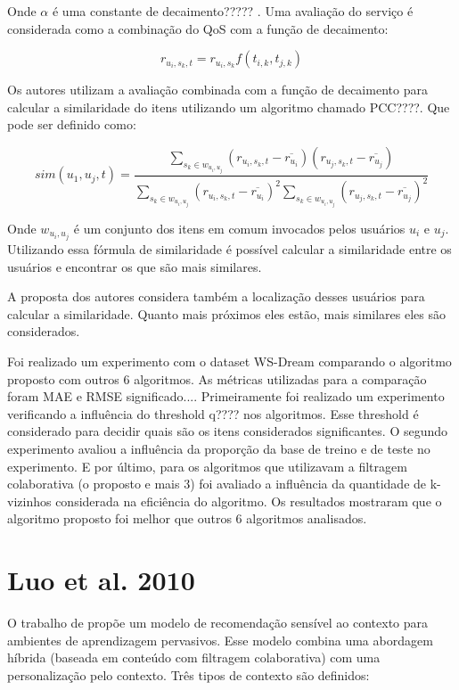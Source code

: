 Onde $\alpha$ é uma constante de decaimento????? . Uma avaliação do serviço é considerada como a combinação do QoS com
a função de decaimento:

\begin{equation}
  r_{u_i, s_k, t} = r_{u_i, s_k} f(t_{i,k}, t_{j,k})
  \label{eq:fan-avaliacao}
\end{equation}

Os autores utilizam a avaliação combinada com a função de decaimento para calcular a similaridade do itens utilizando
um algoritmo chamado PCC????. Que pode ser definido como:

\begin{equation}
  sim(u_1, u_j, t) = \frac{\sum_{s_k \in w_{u_i, u_j}}{(r_{u_i, s_k, t} - \overline{r_{u_i}})(r_{u_j, s_k, t} - \overline{r_{u_j}})}}{\sum_{s_k \in w_{u_i, u_j}}{(r_{u_i, s_k, t} - \overline{r_{u_i}})}^2 \sum_{s_k \in w_{u_i, u_j}}{(r_{u_j, s_k, t} - \overline{r_{u_j}})}^2}
  \label{eq:fan-avaliacao}
\end{equation}


Onde $w_{u_i, u_j}$ é um conjunto dos itens em comum invocados pelos usuários $u_i$ e $u_j$. Utilizando essa fórmula de
similaridade é possível calcular a similaridade entre os usuários e encontrar os que são mais similares.

A proposta dos autores considera também a localização desses usuários para calcular a similaridade. Quanto mais próximos
eles estão, mais similares eles são considerados.

Foi realizado um experimento com o dataset WS-Dream comparando o algoritmo proposto com outros 6 algoritmos. As
métricas utilizadas para a comparação foram MAE e RMSE significado.... Primeiramente foi realizado um experimento
verificando a influência do threshold q???? nos algoritmos. Esse threshold é considerado para decidir quais são os
itens considerados significantes. O segundo experimento avaliou a influência da proporção da base de treino e de teste
no experimento. E por último, para os algoritmos que utilizavam a filtragem colaborativa (o proposto e mais 3) foi
avaliado a influência da quantidade de k-vizinhos considerada na eficiência do algoritmo. Os resultados mostraram que
o algoritmo proposto foi melhor que outros 6 algoritmos analisados.

\section{Luo et al. 2010}

O trabalho de  propõe um modelo de recomendação sensível ao contexto para ambientes de
aprendizagem pervasivos. Esse modelo combina uma abordagem híbrida (baseada em conteúdo com filtragem colaborativa)
com uma personalização pelo contexto. Três tipos de contexto são definidos:

